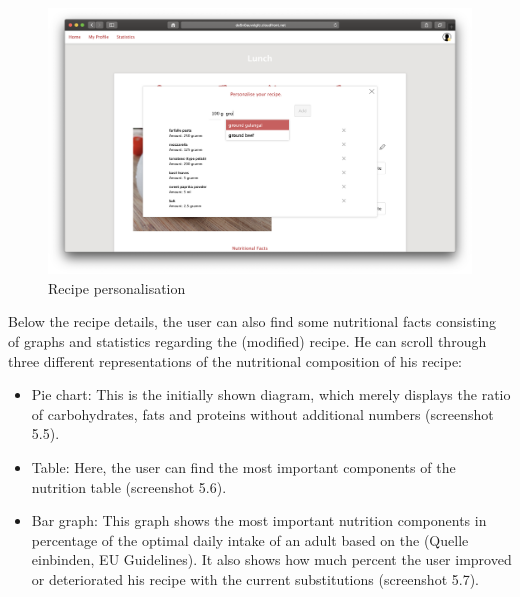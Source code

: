 \vspace{-2em}
\begin{figure}[H]
	\captionsetup{justification=centering}
	\begin{center}
		\includegraphics[scale=0.25]{Ressourcen/img/screenshots/screenshotK.png}
		\vspace{-3em}
		\caption{Recipe personalisation}
	\end{center}
\end{figure}

Below the recipe details, the user can also find some nutritional facts consisting of graphs and statistics regarding the (modified) recipe. He can scroll through three different representations of the nutritional composition of his recipe:
\begin{itemize}
\item Pie chart: This is the initially shown diagram, which merely displays the ratio of carbohydrates, fats and proteins without additional numbers (screenshot 5.5).
\item Table: Here, the user can find the most important components of the nutrition table (screenshot 5.6).
\item Bar graph: This graph shows the most important nutrition components in percentage of the optimal daily intake of an adult based on the (Quelle einbinden, EU Guidelines). It also shows how much percent the user improved or deteriorated his recipe with the current substitutions (screenshot 5.7).
\end{itemize}

